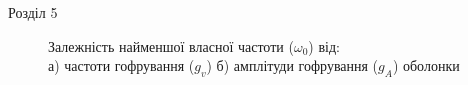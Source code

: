 \documentclass[handout, 8pt]{beamer}
\numberwithin{figure}{section}
\numberwithin{equation}{section}
\numberwithin{table}{section}
\begin{document}
\begin{frame}{Розділ 5}
\begin{figure}[h]
\begin{minipage}[h]{0.49\linewidth}
\end{minipage}
\hfill
\begin{minipage}[h]{0.49\linewidth}
\end{minipage}
\caption{Залежність найменшої власної частоти ($\omega_0$) від: \\а) частоти гофрування ($g_v$) б) амплітуди гофрування ($g_A$) оболонки}
\end{figure}
\end{frame}
\end{document}
